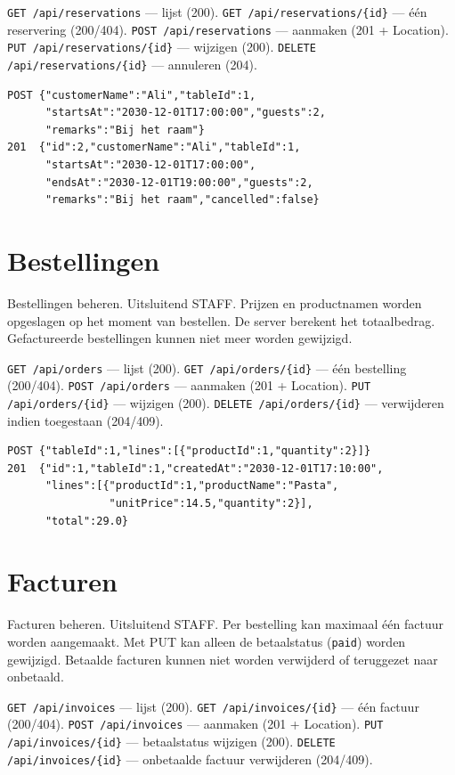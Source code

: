 \documentclass[11pt]{article}
\begin{document}
\texttt{GET /api/reservations} --- lijst (200).
\texttt{GET /api/reservations/\{id\}} --- één reservering (200/404).
\texttt{POST /api/reservations} --- aanmaken (201 + Location).
\texttt{PUT /api/reservations/\{id\}} --- wijzigen (200).
\texttt{DELETE /api/reservations/\{id\}} --- annuleren (204).

\begin{lstlisting}
POST {"customerName":"Ali","tableId":1,
      "startsAt":"2030-12-01T17:00:00","guests":2,
      "remarks":"Bij het raam"}
201  {"id":2,"customerName":"Ali","tableId":1,
      "startsAt":"2030-12-01T17:00:00",
      "endsAt":"2030-12-01T19:00:00","guests":2,
      "remarks":"Bij het raam","cancelled":false}
\end{lstlisting}

\section{Bestellingen}
Bestellingen beheren. Uitsluitend STAFF. Prijzen en productnamen worden
opgeslagen op het moment van bestellen. De server berekent het totaalbedrag.
Gefactureerde bestellingen kunnen niet meer worden gewijzigd.

\texttt{GET /api/orders} --- lijst (200).
\texttt{GET /api/orders/\{id\}} --- één bestelling (200/404).
\texttt{POST /api/orders} --- aanmaken (201 + Location).
\texttt{PUT /api/orders/\{id\}} --- wijzigen (200).
\texttt{DELETE /api/orders/\{id\}} --- verwijderen indien toegestaan (204/409).

\begin{lstlisting}
POST {"tableId":1,"lines":[{"productId":1,"quantity":2}]}
201  {"id":1,"tableId":1,"createdAt":"2030-12-01T17:10:00",
      "lines":[{"productId":1,"productName":"Pasta",
                "unitPrice":14.5,"quantity":2}],
      "total":29.0}
\end{lstlisting}

\section{Facturen}
Facturen beheren. Uitsluitend STAFF. Per bestelling kan maximaal één factuur
worden aangemaakt. Met PUT kan alleen de betaalstatus (\texttt{paid}) worden
gewijzigd. Betaalde facturen kunnen niet worden verwijderd of teruggezet naar
onbetaald.

\texttt{GET /api/invoices} --- lijst (200).
\texttt{GET /api/invoices/\{id\}} --- één factuur (200/404).
\texttt{POST /api/invoices} --- aanmaken (201 + Location).
\texttt{PUT /api/invoices/\{id\}} --- betaalstatus wijzigen (200).
\texttt{DELETE /api/invoices/\{id\}} --- onbetaalde factuur verwijderen (204/409).
\end{document}
